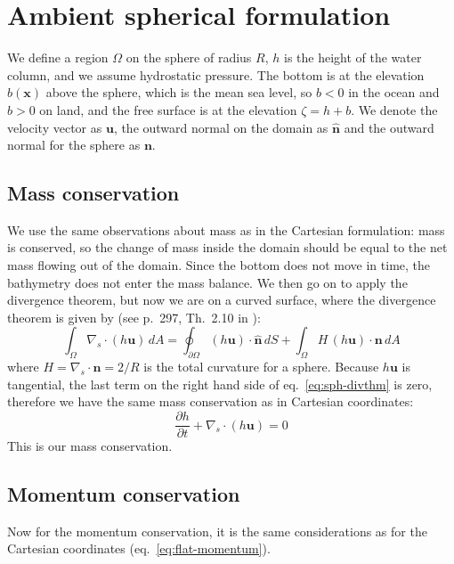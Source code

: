 \section{Ambient spherical formulation}
We define a region $\Omega$ on the sphere of radius $R$, $h$ is the height of the water column, and we assume hydrostatic pressure. The bottom is at the elevation $b(\mathbf{x})$ above the sphere, which is the mean sea level, so $b<0$ in the ocean and $b>0$ on land, and the free surface is at the elevation $\zeta = h + b$. We denote the velocity vector as $\mathbf{u}$, the outward normal on the domain as $\hat{\mathbf{n}}$ and the outward normal for the sphere as $\mathbf{n}$.

\subsection{Mass conservation}
We use the same observations about mass as in the Cartesian formulation: mass is conserved, so the change of mass inside the domain should be equal to the net mass flowing out of the domain. Since the bottom does not move in time, the bathymetry does not enter the mass balance. We then go on to apply the divergence theorem, but now we are on a curved surface, where the divergence theorem is given by (see p.~297, Th.~2.10 in \cite{Dziuk_Elliott_2013}):
\begin{equation}\label{eq:sph-divthm}
    \int_\Omega\nabla_s\cdot(h\mathbf{u})\,dA = \oint_{\partial\Omega}(h\mathbf{u})\cdot\hat{\mathbf{n}}\,dS + \int_\Omega H\,(h\mathbf{u})\cdot\mathbf{n}\,dA
\end{equation}
where $H = \nabla_s\cdot\mathbf{n} = 2/R$ is the total curvature for a sphere. Because $h\mathbf{u}$ is tangential, the last term on the right hand side of eq.~\eqref{eq:sph-divthm} is zero, therefore we have the same mass conservation as in Cartesian coordinates:
\begin{equation*}
    \frac{\partial h}{\partial t} + \nabla_s\cdot(h\mathbf{u}) = 0
\end{equation*}
This is our mass conservation.

\subsection{Momentum conservation}
Now for the momentum conservation, it is the same considerations as for the Cartesian coordinates (eq.~\ref{eq:flat-momentum}).

